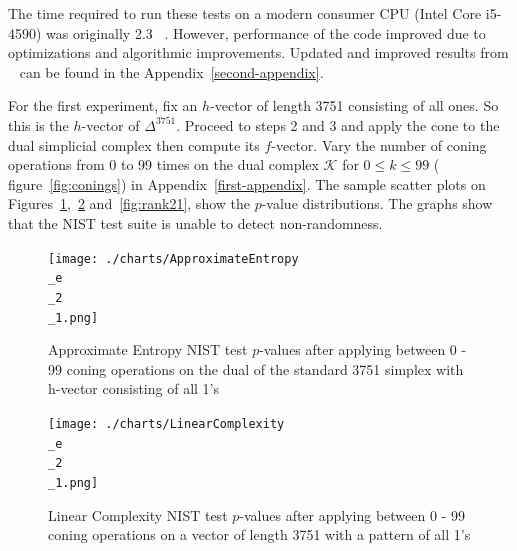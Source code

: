 \documentclass[oneside,12pt]{amsart}
\theoremstyle{definition}
\numberwithin{equation}{section}
\begin{document}
The time required to run these tests on a modern consumer CPU (Intel Core i5-4590) was originally 2.3 ~\cite{ALDH}. However, performance of the code improved due to optimizations and algorithmic improvements. Updated and improved results from ~\cite{ALDH} can be found in the Appendix~\ref{second-appendix}.

For the first experiment, fix an $h$-vector of length 3751 consisting of all ones. So this is the $h$-vector of $\Delta^{3751}$.  Proceed to steps 2 and 3 and apply the cone to the dual simplicial complex then compute its $f$-vector.  Vary the number of coning operations from 0 to 99 times on the dual complex $\mathcal{K}$ for $0 \leq k \leq 99$ ( figure~\ref{fig:conings}) in Appendix~\ref{first-appendix}.  The sample scatter plots on Figures~\ref{fig:approxentropy21},~\ref{fig:linearcomplexity21} and~\ref{fig:rank21}, show the $p$-value distributions.  The graphs show that the NIST test suite is unable to detect non-randomness.   %


\vspace{1cm}

\begin{figure}[h!]
\centering
\caption{Approximate Entropy NIST test $p$-values after applying between 0 - 99 coning operations on the dual of the standard 3751 simplex with h-vector consisting of all 1's }
\texttt{[image: ./charts/ApproximateEntropy\\\_e\\\_2\\\_1.png]}
\label{fig:approxentropy21}
\end{figure}



\begin{figure}[h!]
\centering
\caption{Linear Complexity NIST test $p$-values after applying between 0 - 99 coning operations on a vector of length 3751 with a pattern of all 1's}
\texttt{[image: ./charts/LinearComplexity\\\_e\\\_2\\\_1.png]}
\label{fig:linearcomplexity21}
\end{figure}
\end{document}
